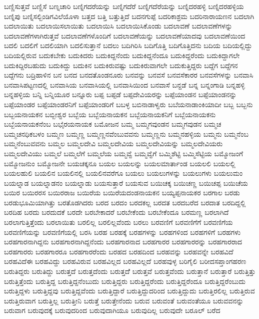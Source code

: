 {ಬಣ್ಣಿಸುತ್ತವೆ
ಬಣ್ಣಿಸೆ
ಬಣ್ನಚಾರಿ
ಬಣ್ನಿಗದರೆಯನ್ನು
ಬಣ್ನಿಗದೆರೆ
ಬಣ್ನಿಗದೆರೆಯನ್ನು
ಬಣ್ನಿದರಹಳ್ಳಿ
ಬಣ್ನಿದರಹಳ್ಳಿಯ
ಬಣ್ನಿಪು
ಬಣ್ನಿಸಲ್ಬಿಂಡಿಗವಿಲೆಯೊಳಾ
ಬತ್ತದ
ಬತ್ತಿ
ಬತ್ತುತ್ತಿದೆ
ಬದನಗುಪ್ಪೆ
ಬದರಿಕಾಶ್ರಮ
ಬದರಿನಾರಾಯಣನ
ಬದಲಾಗಿ
ಬದಲಾಯಿತು
ಬದಲಾಯಿಸಲಾಯಿತು
ಬದಲಾಯಿಸಿ
ಬದಲಾಯಿಸಿಕೊಂಡು
ಬದಲಾವಣೆ
ಬದಲಾವಣೆಗಳನ್ನು
ಬದಲಾವಣೆಗಳಾಗಿರುತ್ತವೆ
ಬದಲಾವಣೆಗಳೊಂದಿಗೆ
ಬದಲಾವಣೆಯನ್ನು
ಬದಲಾವಣೆಯಾದವು
ಬದಲಾವಣೆಯಿಂದ
ಬದಲಿ
ಬದಲಿಗೆ
ಬದಲಿಯಾಗಿ
ಬದಲಿಸುತ್ತಾನೆ
ಬದಲು
ಬದಿಗಿರಿಸಿ
ಬದಿಗೊತ್ತಿ
ಬದಿಗೊತ್ತಿದನು
ಬದಿಯ
ಬದಿಯಲ್ಲಿದ್ದು
ಬದಿಯಲ್ಲಿರುವ
ಬದುಕಬೇಕು
ಬದುಕಿದರು
ಬದುಕಿದ್ದನೆಂದು
ಬದುಕಿದ್ದನೆಂದೂ
ಬದುಕಿದ್ದರೆಂದು
ಬದುಕಿದ್ದಾಗಲೇ
ಬದುಕಿದ್ದಿರಬಹುದು
ಬದುಕಿದ್ದು
ಬದುಕಿನ
ಬದುಕಿರುವಷ್ಟು
ಬದುಕಿರುವಾಗಲೇ
ಬದುಕುತ್ತಿದ್ದರು
ಬದ್ದೆಗ
ಬದ್ದೆಗನ
ಬದ್ದೆಗನು
ಬದ್ರಿಹಾಳಿನ
ಬನ
ಬನದ
ಬನದತೊಂಡನೂರು
ಬನವನ್ನು
ಬನವಸೆ
ಬನವಸೆಕಾರರ
ಬನವಸೆಗಳನ್ನು
ಬನವಾಸಿ
ಬನವಾಸಿಪಟ್ಟಣದಲ್ಲಿ
ಬನವಾಸಿಯ
ಬನವಾಸಿಯಲ್ಲಿ
ಬನವಾಸಿಯಿಂದ
ಬನವಾಸೆ
ಬನ್ದಡೆ
ಬನ್ನ
ಬನ್ನಂಗಾಡಿ
ಬನ್ನಹಳ್ಳಿ
ಬನ್ನಹಳ್ಳಿಯ
ಬನ್ನಿ
ಬನ್ನಿಯೂರ
ಬನ್ನೂರು
ಬಪ್ಪ
ಬಪ್ಪಡೆ
ಬಪ್ಪದೇವಿಯರನ್ನು
ಬಪ್ಪೆಯಾಂಡನ
ಬಪ್ಪೆಯಾಂಡನನ್ನು
ಬಪ್ಪೆಯಾಂಡರ
ಬಪ್ಪೆಯಾಂಡರನಿಗೆ
ಬಪ್ಪೆಯಾಂಡರಿಗೆ
ಬಬಳ್ಳ
ಬಬಿನಾಡಾಳ್ವರು
ಬಬೆಯನಾಡಾಂಕಿಯಾದೀ
ಬಬ್ಬ
ಬಬ್ಬನು
ಬಬ್ಬಯನಾಯಕನ
ಬಬ್ಬೀಶ್ವರ
ಬಬ್ಬೆಯ
ಬಬ್ಬೆಯನಾಯಕನ
ಬಬ್ಬೆಯನಾಯಕನಿಗೆ
ಬಬ್ಬೆಯನಾಯಕನು
ಬಬ್ಬೆಯನಾಯಕನೆಂಬ
ಬಭೈರಯನಾಯಕ
ಬಮೋಜನ
ಬಮ್ಮ
ಬಮ್ಮಗವುಂಡನ
ಬಮ್ಮಗವುಡನ
ಬಮ್ಮಚ
ಬಮ್ಮಚನಧಿಕಬಳಂ
ಬಮ್ಮಣ
ಬಮ್ಮಣ್ಣ
ಬಮ್ಮಣ್ಣನವೆಂಬುವವನು
ಬಮ್ಮಣ್ಣನು
ಬಮ್ಮನಹಳ್ಳಿಯ
ಬಮ್ಮನು
ಬಮ್ಮನೆಂಬ
ಬಮ್ಮನೆಂಬುವವನು
ಬಮ್ಮಲ
ಬಮ್ಮಲದೇವಿ
ಬಮ್ಮಲದೇವಿಯ
ಬಮ್ಮಲದೇವಿಯನ್ನು
ಬಮ್ಮಲದೇವಿಯರು
ಬಮ್ಮಲದೇವಿಯು
ಬಮ್ಮಲೆ
ಬಮ್ಮಲೆಗೆ
ಬಮ್ಮಲೆಯ
ಬಮ್ಮವ್ವೆ
ಬಮ್ಮವ್ವೆಗೆ
ಬಮ್ಮಿಶೆಟ್ಟಿ
ಬಮ್ಮಿಸೆಟ್ಟಿಯ
ಬಮ್ಮೋಜಂಗೆ
ಬಮ್ಮೋಜನುಂ
ಬಮ್ಮೋಜನೇ
ಬಯಚಕ್ಕನೂ
ಬಯಲ
ಬಯಲನ್ನು
ಬಯಲಮಾರ್ತಾಂಡ
ಬಯಲಲಿ
ಬಯಲಲ್ಲಿ
ಬಯಲಹುಲಿ
ಬಯಲಿನ
ಬಯಲಿನಲ್ಲಿ
ಬಯಲಿನವರೆಗೂ
ಬಯಲು
ಬಯಲುಗಳನ್ನು
ಬಯಲುಗಳು
ಬಯಲುಮಂ
ಬಯಲ್ನಾಡ
ಬಯಲ್ನಾಡನಂ
ಬಯಲ್ನಾಡು
ಬಯಸುತ್ತಾರೆ
ಬಯಸುವ
ಬಯಿಚಕ್ಕ
ಬಯಿಚಣ್ಣ
ಬಯಿಚಪ್ಪ
ಬಯಿಚೆಯ
ಬಯಿರ
ಬಯಿರರಸ
ಬಯಿರರಾಜ
ಬಯಿರೆಯ
ಬಯಿರೆಯದಂಡನಾಯಕನ
ಬಯ್ಯಪ್ಪನಾಯಕರ
ಬರಗಾಲ
ಬರಡು
ಬರಡುಭೂಮಿಯಾಗಿತ್ತು
ಬರತೊಡಗಿದರು
ಬರದ
ಬರದಂ
ಬರದಕಲ್ಲ
ಬರದತ
ಬರದಬರೆದ
ಬರದಾತ
ಬರದಿದ್ದಲ್ಲಿ
ಬರದಿಹ
ಬರದು
ಬರದುದಕೆ
ಬರದೇ
ಬರಬೇಕಾದರೆ
ಬರಬೇಕೆಂದು
ಬರಬೇಕೆಂದೂ
ಬರಮಣ್ಣ
ಬರಲಾಗಿದೆ
ಬರಲಾಗುತ್ತಿತ್ತೆಂದು
ಬರಲಾಯಿತು
ಬರಲಿಲ್ಲ
ಬರಲಿಲ್ಲವೆಂದು
ಬರಲು
ಬರವಣಿಗೆ
ಬರವಣಿಗೆಗೆ
ಬರವಣಿಗೆಯ
ಬರವಣಿಗೆಯನ್ನು
ಬರವಣಿಗೆಯಲ್ಲಿ
ಬರಸಿ
ಬರಹ
ಬರಹಕ್ಕೆ
ಬರಹಗಳನ್ನು
ಬರಹಗಳಿಂದ
ಬರಹಗಳಿಗೆ
ಬರಹಗಳು
ಬರಹಗಾರನಾಗಿದ್ದನು
ಬರಹಗಾರನಾಗಿದ್ದನೆಂದು
ಬರಹಗಾರನಾದ
ಬರಹಗಾರರ
ಬರಹಗಾರರನ್ನು
ಬರಹಗಾರರಾದ
ಬರಹಗಾರರು
ಬರಹಗಾರರೂ
ಬರಹಗಾರರೆಂದು
ಬರಹದ
ಬರಹದಿಂದ
ಬರಹವನ್ನು
ಬರಹವನ್ನೇ
ಬರಹವಿದೆ
ಬರಹವಿದೆಈ
ಬರಹವಿದ್ದು
ಬರಹವಿರುವ
ಬರಹವಿಲ್ಲದ
ಬರಹವಿಲ್ಲದೆ
ಬರಹವುಳ್ಳ
ಬರಿಗೈಲಿ
ಬರೀದಸಪ್ತಾಂಗಹರಣ
ಬರುತಿದ್ದರು
ಬರುತಿದ್ದು
ಬರುತ್ತದೆ
ಬರುತ್ತದೆಂದು
ಬರುತ್ತದೆೆ
ಬರುತ್ತವೆ
ಬರುತ್ತವೆಂದು
ಬರುತ್ತಾನೆ
ಬರುತ್ತಾರೆ
ಬರುತ್ತಿತ್ತು
ಬರುತ್ತಿತ್ತೆಂದು
ಬರುತ್ತಿದ್ದ
ಬರುತ್ತಿದ್ದನೆಂಬುದು
ಬರುತ್ತಿದ್ದರು
ಬರುತ್ತಿದ್ದರೆಂದು
ಬರುತ್ತಿದ್ದರೆಂದೂ
ಬರುತ್ತಿದ್ದರೆಂಬುದು
ಬರುತ್ತಿದ್ದಳು
ಬರುತ್ತಿದ್ದವು
ಬರುತ್ತಿದ್ದವೆಂದು
ಬರುತ್ತಿದ್ದಾರೆ
ಬರುತ್ತಿದ್ದುದರಿಂದ
ಬರುತ್ತಿದ್ದುದು
ಬರುತ್ತಿರಲಿಲ್ಲ
ಬರುತ್ತಿರುವ
ಬರುತ್ತಿರುವಾಗ
ಬರುತ್ತಿಲ್ಲ
ಬರುತ್ತೀನಿ
ಬರುತ್ತೆ
ಬರುತ್ತೇನೆಂದು
ಬರುವ
ಬರುವಂತೆ
ಬರುವಂತೆಯೂ
ಬರುವವನನ್ನು
ಬರುವಾಗ
ಬರುವುದಕ್ಕೆ
ಬರುವುದರಿಂದ
ಬರುವುದಾಗಿಯೂ
ಬರುವುದಿಲ್ಲ
ಬರುವುದೇ
ಬರೂಲ್
ಬರೆದ
}
